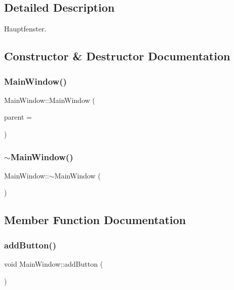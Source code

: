 \subsection{Detailed Description}
Hauptfenster. 

\subsection{Constructor \& Destructor Documentation}
\mbox{\label{class_main_window_a8b244be8b7b7db1b08de2a2acb9409db}} 
\subsubsection{\texorpdfstring{Main\+Window()}{MainWindow()}}
{\footnotesize\ttfamily Main\+Window\+::\+Main\+Window (\begin{DoxyParamCaption}\item[{Q\+Widget $\ast$}]{parent = {} }\end{DoxyParamCaption})\hspace{0.3cm}{\ttfamily [explicit]}}

\mbox{\label{class_main_window_ae98d00a93bc118200eeef9f9bba1dba7}} 
\subsubsection{\texorpdfstring{$\sim$\+Main\+Window()}{~MainWindow()}}
{\footnotesize\ttfamily Main\+Window\+::$\sim$\+Main\+Window (\begin{DoxyParamCaption}{ }\end{DoxyParamCaption})}



\subsection{Member Function Documentation}
\mbox{\label{class_main_window_a962b966d1e81982b7b9da86f0df0bbc1}} 
\subsubsection{\texorpdfstring{add\+Button()}{addButton()}}
{\footnotesize\ttfamily void Main\+Window\+::add\+Button (\begin{DoxyParamCaption}{ }\end{DoxyParamCaption})}

